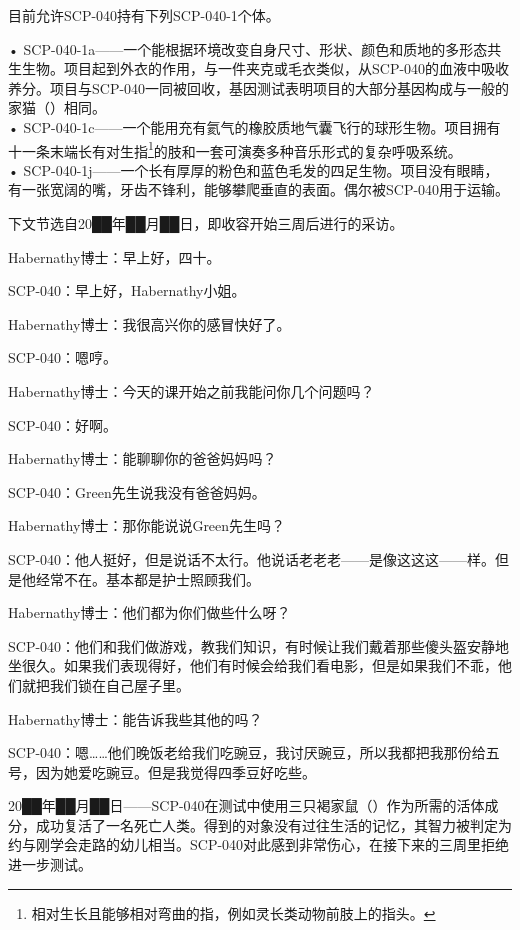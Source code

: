目前允许SCP-040持有下列SCP-040-1个体。

• SCP-040-1a——一个能根据环境改变自身尺寸、形状、颜色和质地的多形态共生生物。项目起到外衣的作用，与一件夹克或毛衣类似，从SCP-040的血液中吸收养分。项目与SCP-040一同被回收，基因测试表明项目的大部分基因构成与一般的家猫（）相同。\\
• SCP-040-1c——一个能用充有氦气的橡胶质地气囊飞行的球形生物。项目拥有十一条末端长有对生指\footnote{相对生长且能够相对弯曲的指，例如灵长类动物前肢上的指头。}的肢和一套可演奏多种音乐形式的复杂呼吸系统。\\
• SCP-040-1j——一个长有厚厚的粉色和蓝色毛发的四足生物。项目没有眼睛，有一张宽阔的嘴，牙齿不锋利，能够攀爬垂直的表面。偶尔被SCP-040用于运输。


下文节选自20██年██月██日，即收容开始三周后进行的采访。

\begin{scpbox}

Habernathy博士：早上好，四十。

SCP-040：早上好，Habernathy小姐。

Habernathy博士：我很高兴你的感冒快好了。

SCP-040：嗯哼。

Habernathy博士：今天的课开始之前我能问你几个问题吗？

SCP-040：好啊。

Habernathy博士：能聊聊你的爸爸妈妈吗？

SCP-040：Green先生说我没有爸爸妈妈。

Habernathy博士：那你能说说Green先生吗？

SCP-040：他人挺好，但是说话不太行。他说话老老老——是像这这这——样。但是他经常不在。基本都是护士照顾我们。

Habernathy博士：他们都为你们做些什么呀？

SCP-040：他们和我们做游戏，教我们知识，有时候让我们戴着那些傻头盔安静地坐很久。如果我们表现得好，他们有时候会给我们看电影，但是如果我们不乖，他们就把我们锁在自己屋子里。

Habernathy博士：能告诉我些其他的吗？

SCP-040：嗯……他们晚饭老给我们吃豌豆，我讨厌豌豆，所以我都把我那份给五号，因为她爱吃豌豆。但是我觉得四季豆好吃些。

\end{scpbox}

20██年██月██日——SCP-040在测试中使用三只褐家鼠（）作为所需的活体成分，成功复活了一名死亡人类。得到的对象没有过往生活的记忆，其智力被判定为约与刚学会走路的幼儿相当。SCP-040对此感到非常伤心，在接下来的三周里拒绝进一步测试。
